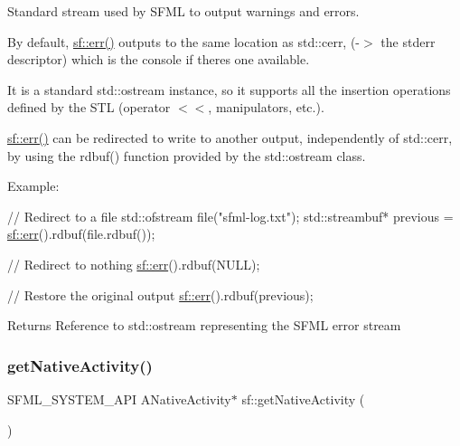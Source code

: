 Standard stream used by S\+F\+ML to output warnings and errors. 

By default, \hyperlink{group__system_ga7fe7f475639e26334606b5142c29551f}{sf\+::err()} outputs to the same location as std\+::cerr, (-\/$>$ the stderr descriptor) which is the console if there\textquotesingle{}s one available.

It is a standard std\+::ostream instance, so it supports all the insertion operations defined by the S\+TL (operator $<$$<$, manipulators, etc.).

\hyperlink{group__system_ga7fe7f475639e26334606b5142c29551f}{sf\+::err()} can be redirected to write to another output, independently of std\+::cerr, by using the rdbuf() function provided by the std\+::ostream class.

Example\+: 
\begin{DoxyCode}
\textcolor{comment}{// Redirect to a file}
std::ofstream file(\textcolor{stringliteral}{"sfml-log.txt"});
std::streambuf* previous = \hyperlink{group__system_ga7fe7f475639e26334606b5142c29551f}{sf::err}().rdbuf(file.rdbuf());

\textcolor{comment}{// Redirect to nothing}
\hyperlink{group__system_ga7fe7f475639e26334606b5142c29551f}{sf::err}().rdbuf(NULL);

\textcolor{comment}{// Restore the original output}
\hyperlink{group__system_ga7fe7f475639e26334606b5142c29551f}{sf::err}().rdbuf(previous);
\end{DoxyCode}


\begin{DoxyReturn}{Returns}
Reference to std\+::ostream representing the S\+F\+ML error stream 
\end{DoxyReturn}
\mbox{\label{group__system_ga9f5460043bdbd5be0ccccd2e6f0ddc41}} 
\subsubsection{\texorpdfstring{get\+Native\+Activity()}{getNativeActivity()}}
{\footnotesize\ttfamily S\+F\+M\+L\+\_\+\+S\+Y\+S\+T\+E\+M\+\_\+\+A\+PI A\+Native\+Activity$\ast$ sf\+::get\+Native\+Activity (\begin{DoxyParamCaption}{ }\end{DoxyParamCaption})}




